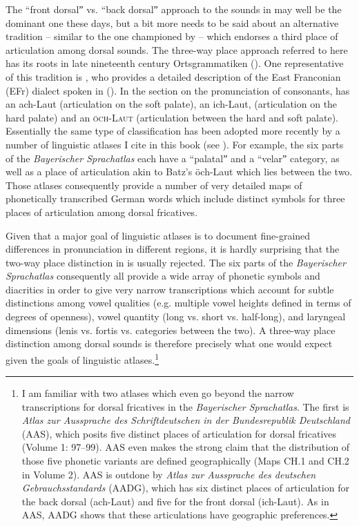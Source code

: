 The “front dorsalˮ vs. “back dorsalˮ approach to the sounds in  may well be the dominant one these days, but a bit more needs to be said about an alternative tradition -- similar to the one championed by \citet{Wiese1996a} -- which endorses a third place of articulation among dorsal sounds. The three-way place approach referred to here has its roots in late nineteenth century Ortsgrammatiken (). One representative of this tradition is \citet{Batz1911}, who provides a detailed description of the East Franconian (EFr) dialect spoken in  (). In the section on the pronunciation of consonants, \citet[16]{Batz1911} has an ach-Laut (articulation on the soft palate), an ich-Laut, (articulation on the hard palate) and an \textsc{öch-Laut} (articulation between the hard and soft palate). Essentially the same type of classification has been adopted more recently by a number of linguistic atlases I cite in this book (see ). For example, the six parts of the \textit{Bayerischer Sprachatlas} each have a “palatalˮ and a “velarˮ category, as well as a place of articulation akin to Batz’s öch-Laut which lies between the two. Those atlases consequently provide a number of very detailed maps of phonetically transcribed German words which include distinct symbols for three places of articulation among dorsal fricatives.

Given that a major goal of linguistic atlases is to document fine-grained differences in pronunciation in different regions, it is hardly surprising that the two-way place distinction in  is usually rejected. The six parts of the \textit{Bayerischer Sprachatlas} consequently all provide a wide array of phonetic symbols and diacritics in order to give very narrow transcriptions which account for subtle distinctions among vowel qualities (e.g. multiple vowel heights defined in terms of degrees of openness), vowel quantity (long vs. short vs. half-long), and laryngeal dimensions (lenis vs. fortis vs. categories between the two). A three-way place distinction among dorsal sounds is therefore precisely what one would expect given the goals of linguistic atlases.\footnote{\label{fn:1:8}I am familiar with two atlases which even go beyond the narrow transcriptions for dorsal fricatives in the \textit{Bayerischer Sprachatlas}. The first is \textit{Atlas zur Aussprache des Schriftdeutschen in der Bundesrepublik Deutschland} (AAS), which posits five distinct places of articulation for dorsal fricatives (Volume 1: 97--99). AAS even makes the strong claim that the distribution of those five phonetic variants are defined geographically (Maps CH.1 and CH.2 in Volume 2). AAS is outdone by \textit{Atlas zur Aussprache des deutschen Gebrauchsstandards} (AADG), which has six distinct places of articulation for the back dorsal (ach-Laut) and five for the front dorsal (ich-Laut). As in AAS, AADG shows that these articulations have geographic preferences.} 

